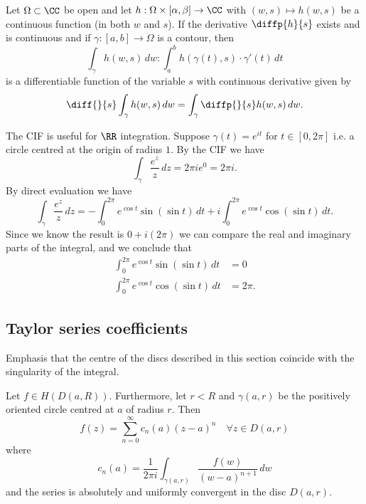 \documentclass[12pt, a4paper]{article}
\begin{document}
\begin{lemma}
    Let \(\Omega \subset \CC\) be open and let \(h : \Omega \times [\alpha,\beta] \to \CC\) with \((w,s) \mapsto h(w,s)\) be a continuous function (in both \(w\) and \(s\)). If the derivative \(\diffp{h}{s}\) exists and is continuous and if \(\gamma :[a,b] \to \Omega\) is a contour, then 
    \[\int_{\gamma} h(w,s) \, dw : \int_{a}^b h(\gamma(t),s) \cdot \gamma'(t) \, dt\]
    is a differentiable function of the variable \(s\) with continuous derivative given by 
    \[\diff{}{s} \int_{\gamma} h(w,s) \, dw = \int_{\gamma} \diffp{}{s}h(w,s) \, dw.\]
\end{lemma}

\begin{mdexample}
    The CIF is useful for \(\RR\) integration. Suppose \(\gamma(t) = e^{it}\) for \(t \in [0,2\pi]\) i.e. a circle centred at the origin of radius \(1\). By the CIF we have
    \[\int_{\gamma} \frac{e^z}{z} \, dz = 2\pi i e^0 =2\pi i.\]
    By direct evaluation we have
    \[\int_{\gamma} \frac{e^z}{z} \, dz = -\int_{0}^{2\pi} e^{\cos t}\sin(\sin t) \, dt + i \int_{0}^{2\pi} e^{\cos t}\cos(\sin t) \, dt.\]
    Since we know the result is \(0+i(2\pi)\) we can compare the real and imaginary parts of the integral, and we conclude that 
    \[\begin{aligned}
        \int_{0}^{2\pi} e^{\cos t}\sin(\sin t) \, dt &= 0 \\
        \int_{0}^{2\pi} e^{\cos t}\cos(\sin t) \, dt &= 2\pi.
    \end{aligned}\]
\end{mdexample}

\subsection{Taylor series coefficients}

\begin{mdremark}
    Emphasis that the centre of the discs described in this section coincide with the singularity of the integral.
\end{mdremark}

\begin{theorem}
    Let \(f \in H(D(a,R))\). Furthermore, let \(r<R\) and \(\gamma(a,r)\) be the positively oriented circle centred at \(a\) of radius \(r\). Then 
    \[f(z) = \sum_{n=0}^{\infty} c_n(a) (z-a)^n \quad \forall z \in D(a,r)\]
    where
    \[c_n(a) = \frac{1}{2\pi i} \int_{\gamma(a,r)} \frac{f(w)}{(w-a)^{n+1}} \, dw\]
    and the series is absolutely and uniformly convergent in the disc \(D(a,r)\).
\end{theorem}
\end{document}
